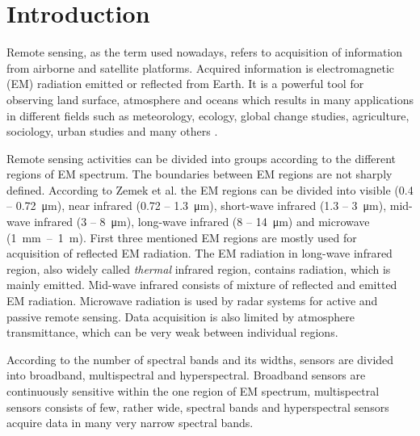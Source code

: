 \chapter*{Introduction}

Remote sensing, as the term used nowadays, refers to acquisition of information from airborne and satellite platforms. Acquired information is electromagnetic (EM) radiation emitted or reflected from Earth. It is a powerful tool for observing land surface, atmosphere and oceans which results in many applications in different fields such as meteorology, ecology, global change studies, agriculture, sociology, urban studies and many others \cite{J13}.

Remote sensing activities can be divided into groups according to the different regions of EM spectrum. The boundaries between EM regions are not sharply defined. According to Zemek et al. \cite{Z14} the EM regions can be divided into visible (0.4 – \SI{0.72}{\micro\meter}), near infrared (0.72 – \SI{1.3}{\micro\meter}), short-wave infrared (1.3 – \SI{3}{\micro\meter}), mid-wave infrared (3 – \SI{8}{\micro\meter}), long-wave infrared (8 – \SI{14}{\micro\meter}) and microwave (\SI{1}{\milli\meter}~–~\SI{1}{\meter}). First three mentioned EM regions are mostly used for acquisition of reflected EM radiation. The EM radiation in long-wave infrared region, also widely called \textit{thermal} infrared region, contains radiation, which is mainly emitted. Mid-wave infrared consists of mixture of reflected and emitted EM radiation. Microwave radiation is used by radar systems for active and passive remote sensing. Data acquisition is also limited by atmosphere transmittance, which can be very weak between individual regions.

According to the number of spectral bands and its widths, sensors are divided into broadband, multispectral and hyperspectral. Broadband sensors are continuously sensitive within the one region of EM spectrum, multispectral sensors consists of few, rather wide, spectral bands and hyperspectral sensors acquire data in many very narrow spectral bands. 

